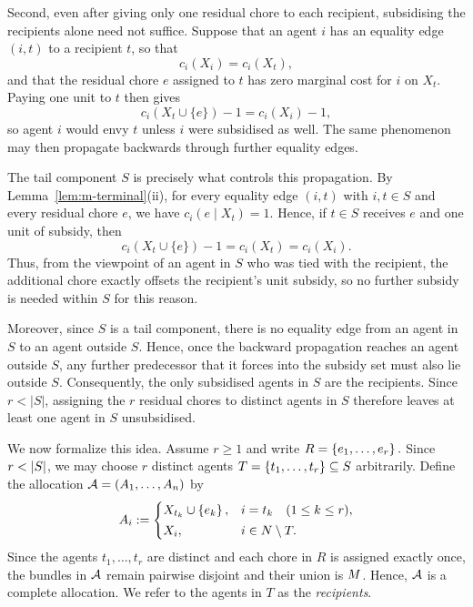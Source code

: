 Second, even after giving only one residual chore to each recipient, subsidising the recipients alone need not suffice. Suppose that an agent $i$ has an equality edge $(i,t)$ to a recipient $t$, so that
\[
c_i(X_i)=c_i(X_t),
\]
and that the residual chore $e$ assigned to $t$ has zero marginal cost for $i$ on $X_t$. Paying one unit to $t$ then gives
\[
c_i(X_t\cup\{e\})-1
   =c_i(X_i)-1,
\]
so agent $i$ would envy $t$ unless $i$ were subsidised as well. The same phenomenon may then propagate backwards through further equality edges.

The tail component $S$ is precisely what controls this propagation. By Lemma~\ref{lem:m-terminal}(ii), for every equality edge $(i,t)$ with $i,t\in S$ and every residual chore $e$, we have $c_i(e\mid X_t)=1$. Hence, if $t\in S$ receives $e$ and one unit of subsidy, then
\[
c_i(X_t\cup\{e\})-1
   =c_i(X_t)
   =c_i(X_i).
\]
Thus, from the viewpoint of an agent in $S$ who was tied with the recipient, the additional chore exactly offsets the recipient's unit subsidy, so no further subsidy is needed within $S$ for this reason.

Moreover, since $S$ is a tail component, there is no equality edge from an agent in $S$ to an agent outside $S$. Hence, once the backward propagation reaches an agent outside $S$, any further predecessor that it forces into the subsidy set must also lie outside $S$. Consequently, the only subsidised agents in $S$ are the recipients. Since $r<|S|$, assigning the $r$ residual chores to distinct agents in $S$ therefore leaves at least one agent in $S$ unsubsidised.

We now formalize this idea. Assume $r\geq 1$ and write
\(
    R=\left\{e_1,\dots,e_r\right\}.
\) Since $r<\left\lvert S\right\rvert$, we may choose $r$ distinct agents
\(
    T=\left\{t_1,\dots,t_r\right\}\subseteq S
\)
arbitrarily. Define the allocation $\mathcal{A}=(A_1,\dots,A_n)$ by
\begin{equation}
\label{eq:m-alloc}
  A_i :=
  \begin{cases}
    X_{t_k}\cup\left\{e_k\right\}, & i=t_k \quad (1\leq k\leq r),\\[2pt]
    X_i, & i\in N\setminus T.
  \end{cases}
\end{equation}
Since the agents $t_1,\dots,t_r$ are distinct and each chore in $R$
is assigned exactly once, the bundles in $\mathcal{A}$ remain pairwise
disjoint and their union is $M$. Hence, $\mathcal{A}$ is a complete
allocation. We refer to the agents in $T$ as the \emph{recipients}.

